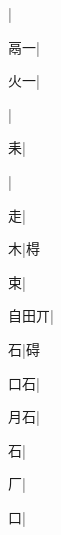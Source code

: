 \begin{multicols}{2}
{{\cjk{}{\cnsym{}　}{\cnsym{}　}{\cnsym{}　}}|{}\par
{\cjk{}{\cnsym{}　}鬲一}|{}\par
{\cjk{}{\cnsym{}　}火一}|{}\par
{\cjk{}{\cnsym{}　}{\cnsym{}　}{\cnsym{}　}}|{}\par
{\cjk{}{\cnsym{}　}{\cnsym{}　}耒}|{}\par
{}|{}\par
{\cjk{}{\cnsym{}　}{\cnsym{}　}走}|{}\par
{\cjk{}{\cnsym{}　}{\cnsym{}　}木}|{\cjk{}棏}\par
{\cjk{}{\cnsym{}　}{\cnsym{}　}束}|{}\par
{\cjk{}自田丌}|{}\par
{\cjk{}{\cnsym{}　}{\cnsym{}　}石}|{\cjk{}碍}\par
{\cjk{}{\cnsym{}　}口石}|{}\par
{\cjk{}{\cnsym{}　}月石}|{}\par
{石}|{}\par
{\cjk{}{\cnsym{}　}{\cnsym{}　}厂}|{}\par
{\cjk{}{\cnsym{}　}{\cnsym{}　}口}|{}\par
}
\end{multicols}
